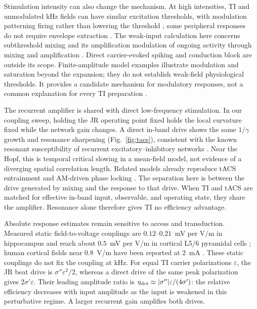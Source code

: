 \documentclass[11pt,a4paper]{article}
\newcommand{\Sig}{\sigma}
\providecommand{\DIFaddtex}[1]{{\protect\color{blue} \sf #1}} %
\providecommand{\DIFdeltex}[1]{{\protect\color{red} \scriptsize #1}} %
\providecommand{\DIFaddbegin}{} %
\providecommand{\DIFaddend}{} %
\providecommand{\DIFdelbegin}{} %
\providecommand{\DIFdelend}{} %
\providecommand{\DIFadd}[1]{\texorpdfstring{\DIFaddtex{#1}}{#1}} %
\providecommand{\DIFdel}[1]{\texorpdfstring{\DIFdeltex{#1}}{}} %
\begin{document}
Stimulation intensity can also change the mechanism. At high intensities, TI and
unmodulated kHz fields can have similar excitation thresholds, with modulation
patterning firing rather than lowering the threshold
\cite{opancar2025,semenov2025}; some peripheral responses do not require envelope
extraction \cite{peripheral2023}. The weak-input calculation here concerns
\DIFdelbegin \DIFdel{subthreshold mixing and its amplification
}\DIFdelend \DIFaddbegin \DIFadd{modulation of ongoing activity through mixing and amplification
\cite{vieira2024,missey2026}. Direct carrier-evoked spiking and conduction block
are outside its scope. Finite-amplitude model examples illustrate modulation and
saturation beyond the expansion; they do not establish weak-field physiological
thresholds}\DIFaddend .
\DIFdelbegin \DIFdel{It provides a candidate mechanism for
modulatory responses, not a common explanation for every TI preparation
\cite{vieira2024,missey2026}.
}\DIFdelend

The recurrent amplifier is shared with direct low-frequency stimulation. In our
coupling sweep, holding the JR operating point fixed holds the local curvature
fixed while the network gain changes. A direct in-band drive shows the same
$1/\gamma$ growth and resonance sharpening (Fig.~\ref{fig:tacs}), consistent with
the known resonant susceptibility of recurrent excitatory--inhibitory networks
\cite{ledoux2011,clusella2023}. Near the Hopf, this is temporal critical slowing
in a mean-field model, not evidence of a diverging spatial correlation length.
Related models already reproduce tACS entrainment and AM-driven phase locking
\cite{ali2013,negahbani2018,krause2023}. The separation here is between the drive
generated by mixing and the response to that drive. When TI and tACS are matched
for effective in-band input, observable, and operating state, they share the
amplifier. Resonance alone therefore gives TI no efficiency advantage.

Absolute response estimates remain sensitive to access and transduction.
Measured static field-to-voltage couplings are $0.12$--$0.21$~mV per V/m in
hippocampus \cite{bikson2004,deans2007} and reach about $0.5$~mV per V/m in cortical
L5/6 pyramidal cells \cite{radman2009}; human cortical fields near $0.8$~V/m have
been reported at $2$~mA \cite{huang2017,huang2017corr}. These static couplings do
not fix the coupling at kHz. For equal TI carrier polarizations $\varepsilon$,
the JR beat drive is $\Sig''\varepsilon^2/2$, whereas a direct drive of the same
peak polarization gives $2\Sig'\varepsilon$. Their leading amplitude ratio is
$\eta_{\rm det}\simeq|\Sig''|\varepsilon/(4\Sig')$: the relative efficiency decreases
\DIFdelbegin \DIFdel{with input amplitude }\DIFdelend \DIFaddbegin \DIFadd{as the input is weakened }\DIFaddend in this perturbative regime. A larger recurrent gain
amplifies both drives.
\end{document}
